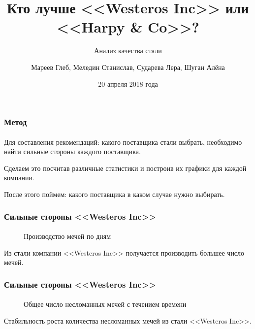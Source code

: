 \documentclass[10pt,pdf,hyperref={unicode}]{beamer}
\title{Кто лучше <<Westeros Inc>> или <<Harpy \& Co>>?}
\subtitle{Анализ качества стали}
\author{
Мареев Глеб, Меледин Станислав, Сударева Лера, Шуган Алёна}
\date{20 апреля 2018 года}
\begin{document}
\begin{frame}
\titlepage
\end{frame} 

\begin{frame}
\frametitle{Метод} 
\framesubtitle{}
Для составления рекомендаций: какого поставщика стали выбрать, необходимо найти сильные стороны каждого поставщика. 

Сделаем это посчитав различные статистики и построив их графики для каждой компании.

После этого поймем: какого поставщика в каком случае нужно выбирать.
\end{frame}


\begin{frame}
\frametitle{Сильные стороны <<Westeros Inc>>} 
\framesubtitle{}

\begin{minipage}{0.4\textwidth}
 	\begin{figure}[L]
		\caption{Производство мечей по дням}	
	\end{figure}
\end{minipage}
\hfill
\begin{minipage}{0.4\textwidth}
	Из стали компании <<Westeros Inc>> получается производить большее число мечей.
\end{minipage}
\end{frame}



\begin{frame}
\frametitle{Сильные стороны <<Westeros Inc>>} 
\framesubtitle{}

\begin{minipage}{0.4\textwidth}
 	\begin{figure}[L]
		\caption{Общее число несломанных мечей с течением времени}		
	\end{figure}
\end{minipage}
\hfill
\begin{minipage}{0.4\textwidth}
	Стабильность роста количества несломанных мечей из стали <<Westeros Inc>>.
\end{minipage}
\end{frame}
\end{document}
